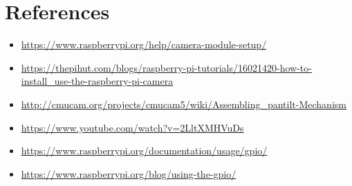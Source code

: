 \documentclass[11pt,a4paper]{article}
\begin{document}
	 \section{References}
	\begin{itemize}
		\item \url{https://www.raspberrypi.org/help/camera-module-setup/}
		\item \url{https://thepihut.com/blogs/raspberry-pi-tutorials/16021420-how-to-install_use-the-raspberry-pi-camera}
		\item \url{http://cmucam.org/projects/cmucam5/wiki/Assembling_pantilt-Mechanism}
		\item \url{https://www.youtube.com/watch?v=2LltXMHVuDs}
	\item \url{https://www.raspberrypi.org/documentation/usage/gpio/}	
	\item \url{https://www.raspberrypi.org/blog/using-the-gpio/}	
	\end{itemize}
\end{document}
